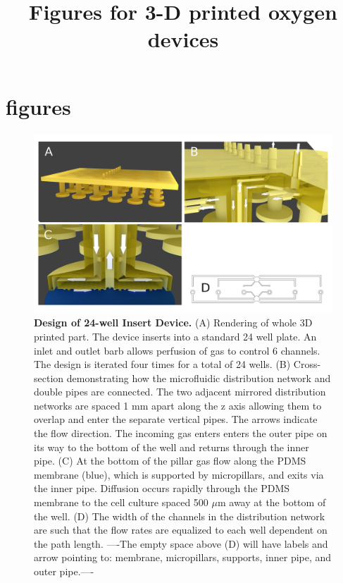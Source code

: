 \documentclass[]{article}
\title{Figures for  3-D printed oxygen devices}
\author{}
\begin{document}

\section{figures}

\begin{figure}[H]
\includegraphics[scale=0.2]{fig1.png} 
\caption{
{\bf Design of 24-well Insert Device.}
(A) Rendering of whole 3D printed part.
The device inserts into a standard 24 well plate.
An inlet and outlet barb allows perfusion of gas to control 6 channels.
The design is iterated four times for a total of 24 wells.
(B) Cross-section demonstrating how the microfluidic distribution network and double pipes are connected. 
The two adjacent mirrored distribution networks are spaced 1 mm apart along the z axis allowing them to overlap and enter the separate vertical pipes.
The arrows indicate the flow direction.
The incoming gas enters enters the outer pipe on its way to the bottom of the well and returns through the inner pipe.
(C) At the bottom of the pillar gas flow along the PDMS membrane (blue), which is supported by micropillars, and exits via the inner pipe.
Diffusion occurs rapidly through the PDMS membrane to the cell culture spaced 500 $\mu$m away at the bottom of the well.
(D) The width of the channels in the distribution network are such that the flow rates are equalized to each well dependent on the path length.
----The empty space above (D) will have labels and arrow pointing to: membrane, micropillars, supports, inner pipe, and outer pipe.----
}
\label{figure1}
\end{figure}
\end{document}
